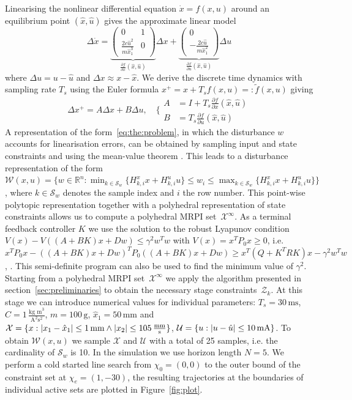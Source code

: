 Linearising the nonlinear differential 
equation $\dot x = f(x,u)$ around an equilibrium point $(\hat x, \hat
u)$ gives the approximate linear model 
%
\[
	 \Delta\dot{x} = \underbrace{\left(\begin{array}{cc}
	0 & 1 \\ \frac{2c\hat u^2}{m\hat x_1^3} & 0
	\end{array}\right)}_{\frac{\partial f}{\partial x}(\hat x,\hat
      u)}\Delta x 
+ \underbrace{\left(\begin{array}{c}
	0 \\ - \frac{2c\hat u}{m\hat x_1^2}
	\end{array}\right)}_{\frac{\partial f}{\partial u}(\hat x,\hat
      u)}\Delta u
\]
%
where $\Delta u = u -\hat{u}$ and $\Delta x \approx x-\hat{x}$.
We derive the discrete time dynamics with sampling rate $T_s$ using
the Euler formula $x^+=x+T_s f(x,u) =:\tilde f(x,u)$ giving
\[
\Delta x^+ = A \Delta x + B \Delta u , \quad
\Biggl\{\begin{aligned} A &= I+T_s\frac{\partial f}{\partial  x}(\hat
  x,\hat u) \\
B &= T_s \frac{\partial f}{\partial u}(\hat x,\hat u)
\end{aligned}
\]
%
A representation of the form~\eqref{eq:the:problem}, in which the disturbance $w$ accounts for linearisation
errors, can be obtained by sampling input and state
constraints and using the mean-value theorem \citep[see][]{Schaich:2015}. This leads
to a disturbance representation of the form $\mathcal W(x,u)=\{w\in\mathbb R^n: 
\min_{k\in\mathcal S_w}\{ H_{k,i}^x x + H_{k,i}^u u\} \leq w_i \leq \max_{k\in\mathcal S_w} 
\{ H_{k,i}^x x + H_{k,i}^u u \} \}$,
where ${k\in\mathcal S_w}$ denotes the sample index and $i$ the row number. This point-wise polytopic representation
together with a polyhedral representation of state constraints allows us to compute a polyhedral
MRPI set~$\mathcal X^\infty$. As a terminal feedback controller $K$ we use the solution to the robust 
Lyapunov condition $V(x)-V((A+BK)x+Dw)\leq \gamma^2 w^Tw$ 
with $V(x)=x^T P_0 x\geq0$, i.e. $x^TP_0x - ((A+BK)x+Dw)^TP_0((A+BK)x+Dw)\geq x^T(Q+K^TRK)x -\gamma^2 w^T w$, 
\cite[see e.g.][]{Boyd:94}. This semi-definite program can also be used to find the minimum value of $\gamma^2$. Starting from 
a polyhedral MRPI set~$\mathcal X^\infty$ we apply the algorithm presented in section~\ref{sec:preliminaries}
to obtain the necessary stage constraints~$\mathcal Z_k$. At this stage we can introduce numerical values
for individual parameters: $T_s=30\,\text{ms}$, $C=1\,\frac{\text{kg m}^3}{\text{A}^2\text{s}^2}$,
$m=100\,\text{g}$, $\hat x_1 = 50\,\text{mm}$ and $\mathcal X=\{x:
\left|x_1- \hat x_1\right|\leq 1\,\text{mm}\wedge \left|x_2\right|\leq 105\,\frac{\text{mm}}{\text{s}}\}$, $\mathcal
U=\{u:\left| u-\hat u\right|\leq 10 \,\text{mA}\}$.
To obtain $\mathcal W(x,u)$ we sample $\mathcal X$ and $\mathcal U$ with a total of 25 samples, i.e. the cardinality
of $\mathcal S_w$ is 10. In the simulation we use horizon length $N=5$. We perform a cold started line search from $\chi_0=(0,0)$
to the outer bound of the constraint set at $\chi_e=(1,-30)$, the resulting trajectories at the boundaries of
individual active sets are plotted in Figure~\ref{fig:plot}.

